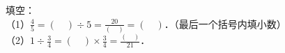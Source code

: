 
填空：\\
（1）$\frac{4}{5}=(\quad) \div 5=\frac{20}{(\quad)}=(\quad)$．（最后一个括号内填小数）\\
（2）$1 \div \frac{3}{4}=(\quad) \times \frac{3}{4}=\frac{(\quad)}{21}$．

